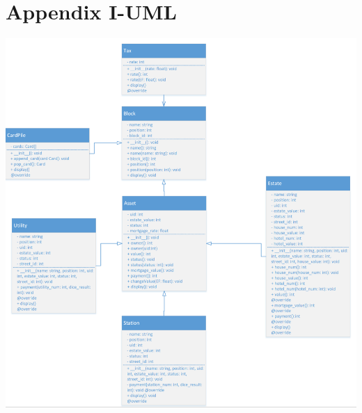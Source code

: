 \documentclass[a4paper,12pt]{article}
\begin{document}



\section*{Appendix I-UML}

\includegraphics[scale=0.9]{image/Block.png}
\\
\\
\end{document}
